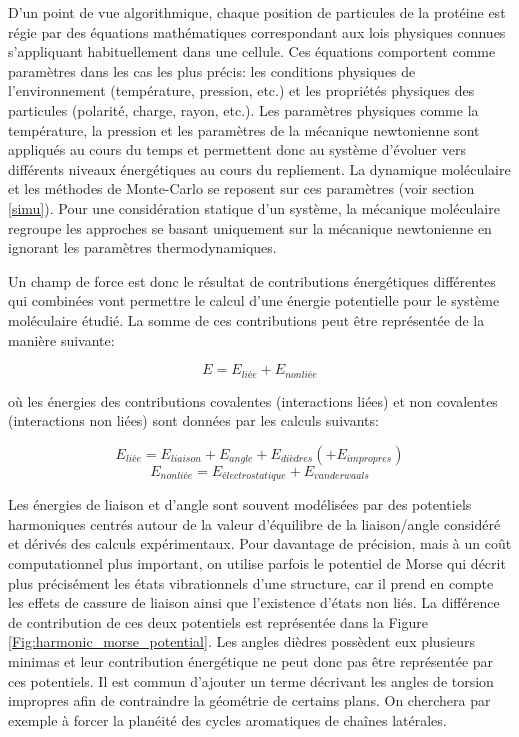 D'un point de vue algorithmique, chaque position de particules de la protéine est régie par des équations mathématiques correspondant aux lois physiques connues s'appliquant habituellement dans une cellule. Ces équations comportent comme paramètres dans les cas les plus précis: les conditions physiques de l'environnement (température, pression, etc.) et les propriétés physiques des particules (polarité, charge, rayon, etc.). Les paramètres physiques comme la température, la pression et les paramètres de la mécanique newtonienne sont appliqués au cours du temps et permettent donc au système d'évoluer vers différents niveaux énergétiques au cours du repliement. La dynamique moléculaire et les méthodes de Monte-Carlo se reposent sur ces paramètres (voir section \ref{simu}). 
Pour une considération statique d'un système, la mécanique moléculaire regroupe les approches se basant uniquement sur la mécanique newtonienne en ignorant les paramètres thermodynamiques.

Un champ de force est donc le résultat de contributions énergétiques différentes qui combinées vont permettre le calcul d'une énergie potentielle pour le système moléculaire étudié. La somme de ces contributions peut  être représentée de la manière suivante:

$$E = E_{liée} + E_{nonliée}$$

où les énergies des contributions covalentes (interactions liées) et non covalentes (interactions non liées) sont données par les calculs suivants:

$$E_{liée} = E_{liaison} + E_{angle} + E_{dièdres} (+ E_{impropres})$$
$$E_{nonliée} = E_{électrostatique} + E_{vanderwaals}$$

Les énergies de liaison et d'angle sont souvent modélisées par des potentiels harmoniques centrés autour de la valeur d'équilibre de la liaison/angle considéré et dérivés des calculs expérimentaux. Pour davantage de précision, mais à un coût computationnel plus important, on utilise parfois le potentiel de Morse qui décrit plus précisément les états vibrationnels d'une structure, car il prend en compte les effets de cassure de liaison ainsi que l'existence d'états non liés. La différence de contribution de ces deux potentiels est représentée dans la Figure \ref{Fig:harmonic_morse_potential}. Les angles dièdres possèdent eux plusieurs minimas et leur contribution énergétique ne peut donc pas être représentée par ces potentiels. Il est commun d'ajouter un terme décrivant les angles de torsion impropres afin de contraindre la géométrie de certains plans. On cherchera par exemple à forcer la planéité des cycles aromatiques de chaînes latérales.


